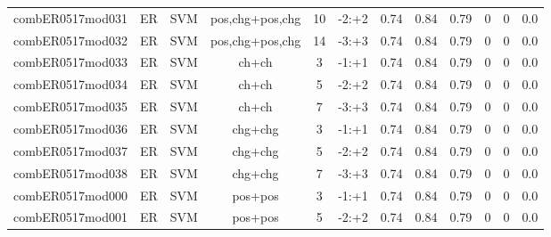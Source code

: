 \documentclass[a4paper]{article}
\begin{document}
\begin{landscape}
\begin{center}
\begin{tabular}{ |c|c|c|c|c|c|c|c|c|c|c|c|}
 	
 		
 		\small{ combER0517mod031 } & ER & SVM & pos,chg+pos,chg  &  10 &  -2:+2  &  0.74 & 0.84 & 0.79  &  0 & 0 & 0.0 \\
 		

 	
 
 	
 		
 		\small{ combER0517mod032 } & ER & SVM & pos,chg+pos,chg  &  14 &  -3:+3  &  0.74 & 0.84 & 0.79  &  0 & 0 & 0.0 \\
 		

 	
 
 	
 		
 		\small{ combER0517mod033 } & ER & SVM & ch+ch  &  3 &  -1:+1  &  0.74 & 0.84 & 0.79  &  0 & 0 & 0.0 \\
 		

 	
 
 	
 		
 		\small{ combER0517mod034 } & ER & SVM & ch+ch  &  5 &  -2:+2  &  0.74 & 0.84 & 0.79  &  0 & 0 & 0.0 \\
 		

 	
 
 	
 		
 		\small{ combER0517mod035 } & ER & SVM & ch+ch  &  7 &  -3:+3  &  0.74 & 0.84 & 0.79  &  0 & 0 & 0.0 \\
 		

 	
 
 	
 		
 		\small{ combER0517mod036 } & ER & SVM & chg+chg  &  3 &  -1:+1  &  0.74 & 0.84 & 0.79  &  0 & 0 & 0.0 \\
 		

 	
 
 	
 		
 		\small{ combER0517mod037 } & ER & SVM & chg+chg  &  5 &  -2:+2  &  0.74 & 0.84 & 0.79  &  0 & 0 & 0.0 \\
 		

 	
 
 	
 		
 		\small{ combER0517mod038 } & ER & SVM & chg+chg  &  7 &  -3:+3  &  0.74 & 0.84 & 0.79  &  0 & 0 & 0.0 \\
 		

 	
 
 	
 		
 		\small{ combER0517mod000 } & ER & SVM & pos+pos  &  3 &  -1:+1  &  0.74 & 0.84 & 0.79  &  0 & 0 & 0.0 \\
 		

 	
 
 	
 		
 		\small{ combER0517mod001 } & ER & SVM & pos+pos  &  5 &  -2:+2  &  0.74 & 0.84 & 0.79  &  0 & 0 & 0.0 \\
 		


\end{tabular}
\end{center}
\end{landscape}
\end{document}
